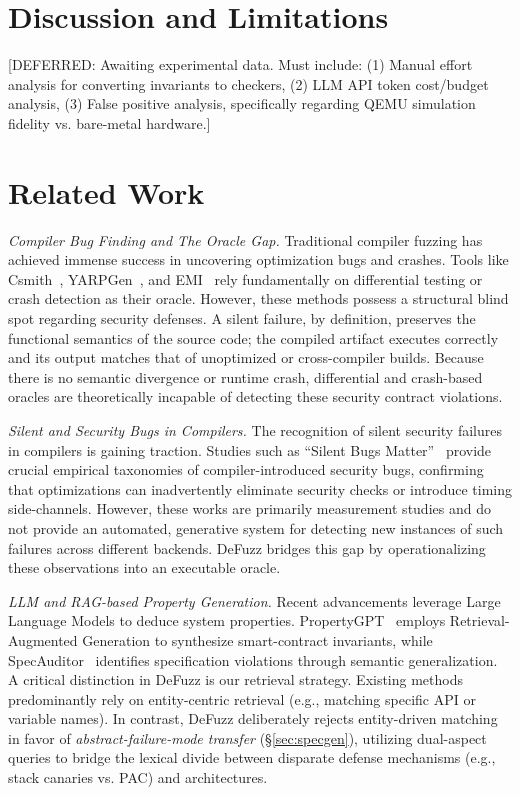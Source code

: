 \documentclass[conference]{IEEEtran}
\begin{document}
\section{Discussion and Limitations}\label{sec:disc}
[DEFERRED: Awaiting experimental data. Must include: (1) Manual effort analysis for converting invariants to checkers, (2) LLM API token cost/budget analysis, (3) False positive analysis, specifically regarding QEMU simulation fidelity vs. bare-metal hardware.]


\section{Related Work}\label{sec:related}

\emph{Compiler Bug Finding and The Oracle Gap.}
Traditional compiler fuzzing has achieved immense success in uncovering optimization bugs and crashes. Tools like Csmith~\cite{yang2011csmith}, YARPGen~\cite{livinskii2020yarpgen}, and EMI~\cite{le2014emi} rely fundamentally on differential testing or crash detection as their oracle. However, these methods possess a structural blind spot regarding security defenses. A silent failure, by definition, preserves the functional semantics of the source code; the compiled artifact executes correctly and its output matches that of unoptimized or cross-compiler builds. Because there is no semantic divergence or runtime crash, differential and crash-based oracles are theoretically incapable of detecting these security contract violations.

\emph{Silent and Security Bugs in Compilers.}
The recognition of silent security failures in compilers is gaining traction. Studies such as ``Silent Bugs Matter''~\cite{silentbugs2023} provide crucial empirical taxonomies of compiler-introduced security bugs, confirming that optimizations can inadvertently eliminate security checks or introduce timing side-channels. However, these works are primarily measurement studies and do not provide an automated, generative system for detecting new instances of such failures across different backends. DeFuzz bridges this gap by operationalizing these observations into an executable oracle.

\emph{LLM and RAG-based Property Generation.}
Recent advancements leverage Large Language Models to deduce system properties. PropertyGPT~\cite{liu2025propertygpt} employs Retrieval-Augmented Generation to synthesize smart-contract invariants, while SpecAuditor~\cite{lin2026specauditor} identifies specification violations through semantic generalization. A critical distinction in DeFuzz is our retrieval strategy. Existing methods predominantly rely on entity-centric retrieval (e.g., matching specific API or variable names). In contrast, DeFuzz deliberately rejects entity-driven matching in favor of \emph{abstract-failure-mode transfer} (\S\ref{sec:specgen}), utilizing dual-aspect queries to bridge the lexical divide between disparate defense mechanisms (e.g., stack canaries vs. PAC) and architectures.
\end{document}
